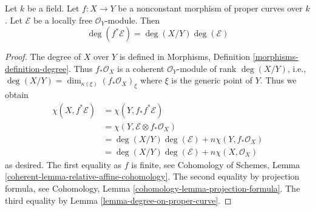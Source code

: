 \begin{lemma}
\label{lemma-degree-pullback-map-proper-curves}
Let $k$ be a field. Let $f : X \to Y$ be a nonconstant morphism of
proper curves over $k$. Let $\mathcal{E}$ be a locally free
$\mathcal{O}_Y$-module. Then
$$
\deg(f^*\mathcal{E}) = \deg(X/Y) \deg(\mathcal{E})
$$
\end{lemma}

\begin{proof}
The degree of $X$ over $Y$ is defined in
Morphisms, Definition \ref{morphisms-definition-degree}.
Thus $f_*\mathcal{O}_X$ is a coherent $\mathcal{O}_Y$-module
of rank $\deg(X/Y)$, i.e.,
$\deg(X/Y) = \dim_{\kappa(\xi)} (f_*\mathcal{O}_X)_\xi$ where $\xi$
is the generic point of $Y$. Thus we obtain
\begin{align*}
\chi(X, f^*\mathcal{E})
& =
\chi(Y, f_*f^*\mathcal{E}) \\
& =
\chi(Y, \mathcal{E} \otimes f_*\mathcal{O}_X) \\
& =
\deg(X/Y) \deg(\mathcal{E}) + n \chi(Y, f_*\mathcal{O}_X) \\
& =
\deg(X/Y) \deg(\mathcal{E}) + n \chi(X, \mathcal{O}_X)
\end{align*}
as desired. The first equality as $f$ is finite, see
Cohomology of Schemes, Lemma \ref{coherent-lemma-relative-affine-cohomology}.
The second equality by projection formula, see
Cohomology, Lemma \ref{cohomology-lemma-projection-formula}.
The third equality by Lemma \ref{lemma-degree-on-proper-curve}.
\end{proof}










